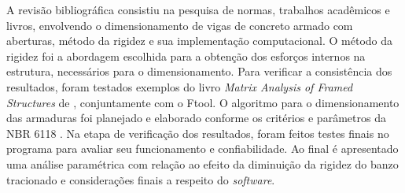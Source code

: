 A revisão bibliográfica consistiu na pesquisa de normas, trabalhos acadêmicos e livros,
envolvendo o dimensionamento de vigas de concreto armado com aberturas, método da
rigidez e sua implementação computacional. O método da rigidez foi a abordagem escolhida
para a obtenção dos esforços internos na estrutura, necessários para o dimensionamento. Para
verificar a consistência dos resultados, foram testados exemplos do livro \textit{Matrix Analysis of
Framed Structures} de , conjuntamente com o Ftool. O algoritmo para o dimensionamento das armaduras foi planejado e elaborado
conforme os critérios e parâmetros da NBR 6118 \cite{ABNT_NBR6118_2026}. Na etapa de verificação dos
resultados, foram feitos testes finais no programa para avaliar seu funcionamento e
confiabilidade. Ao final é apresentado uma análise paramétrica com relação ao efeito da diminuição da rigidez do banzo tracionado e considerações finais a
respeito do \textit{software}.
